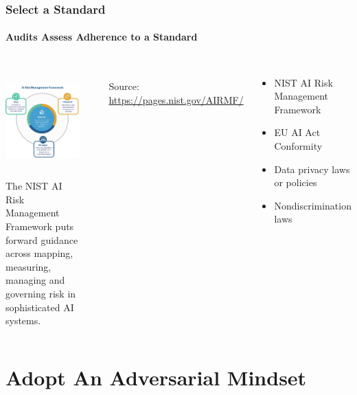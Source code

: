 \documentclass[11pt,
               aspectratio=169,
               hyperref={colorlinks}
               ]{beamer}
\begin{document}
			\begin{frame}
				
				\frametitle{Select a Standard}
				\framesubtitle{Audits Assess Adherence to a Standard}		
				
				\begin{columns}
					
					\centering
					\includegraphics[height=120pt]{../img/NIST_RMF_img1.png}\\
					\scriptsize{The NIST AI Risk Management Framework puts forward guidance across mapping, measuring, managing and governing risk in sophisticated AI systems.}
					
					\par\noindent\rule{100pt}{0.4pt}\\
					\vspace{5pt}
					\scriptsize{\tiny{Source: \url{https://pages.nist.gov/AIRMF/}}}
					
					\vspace{-5pt}
					\begin{itemize}
						\item NIST AI Risk Management Framework
						\item EU AI Act Conformity
						\item Data privacy laws or policies
						\item Nondiscrimination laws
					\end{itemize}
				\end{columns}

			\end{frame}


	\section{Adopt An Adversarial Mindset}
\end{document}
